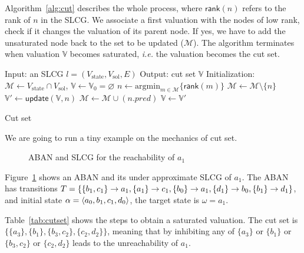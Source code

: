 Algorithm~\ref{alg:cut} describes the whole process, where $\mathsf{rank}(n)$ refers to the rank of $n$ in the SLCG.
We associate a first valuation with the nodes of low rank, check if it changes the valuation of its parent node.
If yes, we have to add the unsaturated node back to the set to be updated ($\mathcal{M}$).
The algorithm terminates when valuation $\mathbb{V}$ becomes saturated, \textit{i.e.} the valuation becomes the cut set.

\begin{algorithm}[ht]
\begin{algorithmic}
\State Input: an SLCG $l= (V_{\mathrm{state}},V_{\mathrm{sol}},E)$
\State Output: cut set $\mathbb{V}$
\State Initialization: $\mathcal{M}\gets V_{\mathrm{state}}\cap V_{\mathrm{sol}}$, $\mathbb{V}\gets\mathbb{V}_0=\varnothing$
        \State $n\gets\mathrm{argmin}_{m\in\mathcal{M}}\{\mathsf{rank}(m)\}$
		\State $\mathcal{M}\gets\mathcal{M}\setminus\{n\}$
		\State $\mathbb{V}'\gets\mathsf{update}(\mathbb{V},n)$
		    \State $\mathcal{M}\gets\mathcal{M}\cup(n.pred)$
		\EndIf
		\State $\mathbb{V}\gets\mathbb{V}'$
\EndWhile
\State {} 
\end{algorithmic}
\caption{Cut set}\label{alg:cut}
\end{algorithm}

We are going to run a tiny example on the mechanics of cut set.

\begin{figure}[ht]
\centering

\caption[Example of cut set]{ABAN and SLCG for the reachability of $a_1$}\label{fig:cut}
\end{figure}

\begin{example}\label{example:cutset}
Figure~\ref{fig:cut} shows an ABAN and its under approximate SLCG of $a_1$.
The ABAN has transitions $T=\{\{b_1,c_1\}\rightarrow a_1,\{a_1\}\rightarrow c_1,\{b_0\}\rightarrow a_1,\{d_1\}\rightarrow b_0,\{b_1\}\rightarrow d_1\}$, and initial state $\alpha= \langle a_0,b_1,c_1,d_0\rangle$, the target state is $\omega=a_1$.


Table~\ref{tab:cutset} shows the steps to obtain a saturated valuation.
The cut set is $\{\{a_3\},\{b_1\},\{b_3,c_2\},\{c_2,d_2\}\}$, meaning that by inhibiting any of $\{a_3\}$ or $\{b_1\}$ or $\{b_3,c_2\}$ or $\{c_2,d_2\}$ leads to the unreachability of $a_1$.

\end{example}


